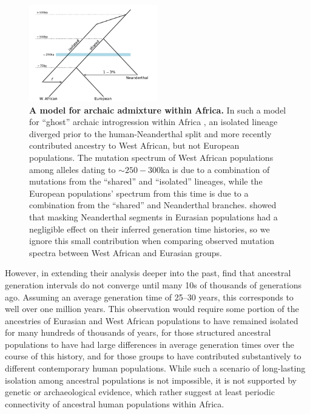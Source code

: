 \documentclass[]{article}
\begin{document}
\begin{figure}[t!]
    \centering
    \includegraphics[width=0.5\textwidth]{durvasula_model}
    \caption{
        \textbf{A model for archaic admixture within Africa.} In such a model
        for ``ghost'' archaic introgression within Africa
        \citep{durvasula2020recovering}, an isolated lineage diverged prior to
        the human-Neanderthal split and more recently contributed ancestry to
        West African, but not European populations. The mutation spectrum of
        West African populations among alleles dating to $\sim250-300$ka is due
        to a combination of mutations from the ``shared'' and ``isolated''
        lineages, while the European populations' spectrum from this time is
        due to a combination from the ``shared'' and Neanderthal branches.
        \citet{wang2023human} showed that masking Neanderthal segments in
        Eurasian populations had a negligible effect on their inferred
        generation time histories, so we ignore this small contribution when
        comparing observed mutation spectra between West African and Eurasian
        groups.
    }
    \label{fig:durvasula-model}
\end{figure}

However, in extending their analysis deeper into the past,
\citet{wang2023human} find that ancestral generation intervals do not converge
until many 10s of thousands of generations ago. Assuming an average generation
time of 25--30 years, this corresponds to well over one million years. This
observation would require some portion of the ancestries of Eurasian and West
African populations to have remained isolated for many hundreds of thousands of
years, for those structured ancestral populations to have had large differences
in average generation times over the course of this history, and for those
groups to have contributed substantively to different contemporary human
populations. While such a scenario of long-lasting isolation among
ancestral populations is not impossible, it is not supported by genetic
\citep{ragsdale2022weakly} or archaeological
\citep{scerri2018did} evidence, which rather suggest at least periodic
connectivity of ancestral human populations within Africa.
\end{document}
